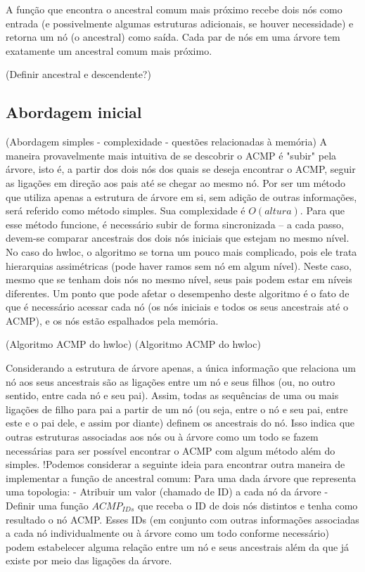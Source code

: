 \documentclass{ufsc-thesis}
\begin{document}
A função que encontra o ancestral comum mais próximo recebe dois nós como entrada (e possivelmente algumas estruturas adicionais, se houver necessidade)
e retorna um nó (o ancestral) como saída.
Cada par de nós em uma árvore tem exatamente um ancestral comum mais próximo.

(Definir ancestral e descendente?)

\subsection{Abordagem inicial}

(Abordagem simples - complexidade - questões relacionadas à memória)
A maneira provavelmente mais intuitiva de se descobrir o ACMP é "subir" pela árvore, isto é, a partir dos dois nós dos quais se deseja encontrar o ACMP,
seguir as ligações em direção aos pais até se chegar ao mesmo nó.
Por ser um método que utiliza apenas a estrutura de árvore em si, sem adição de outras informações, será referido como método simples.
Sua complexidade é $O(altura)$.
Para que esse método funcione, é necessário subir de forma sincronizada -- a cada passo, devem-se comparar ancestrais dos dois nós iniciais que estejam no mesmo nível.
No caso do hwloc, o algoritmo se torna um pouco mais complicado, pois ele trata hierarquias assimétricas (pode haver ramos sem nó em algum nível).
Neste caso, mesmo que se tenham dois nós no mesmo nível, seus pais podem estar em níveis diferentes.
Um ponto que pode afetar o desempenho deste algoritmo é o fato de que é necessário acessar cada nó
(os nós iniciais e todos os seus ancestrais até o ACMP), e os nós estão espalhados pela memória.

(Algoritmo ACMP do hwloc)
(Algoritmo ACMP do hwloc)

Considerando a estrutura de árvore apenas, a única informação que relaciona um nó aos seus ancestrais
são as ligações entre um nó e seus filhos (ou, no outro sentido, entre cada nó e seu pai).
Assim, todas as sequências de uma ou mais ligações de filho para pai a partir de um nó (ou seja,
entre o nó e seu pai, entre este e o pai dele, e assim por diante) definem os ancestrais do nó.
Isso indica que outras estruturas associadas aos nós ou à árvore como um todo se fazem necessárias
para ser possível encontrar o ACMP com algum método além do simples.
!Podemos considerar a seguinte ideia para encontrar outra maneira de implementar a função de ancestral comum:
Para uma dada árvore que representa uma topologia:
- Atribuir um valor (chamado de ID) a cada nó da árvore
- Definir uma função $ACMP_{IDs}$ que receba o ID de dois nós distintos e tenha como resultado o nó ACMP.
Esses IDs (em conjunto com outras informações associadas a cada nó individualmente ou à árvore como um todo conforme necessário)
podem estabelecer alguma relação entre um nó e seus ancestrais além da que já existe por meio das ligações da árvore.
\end{document}
